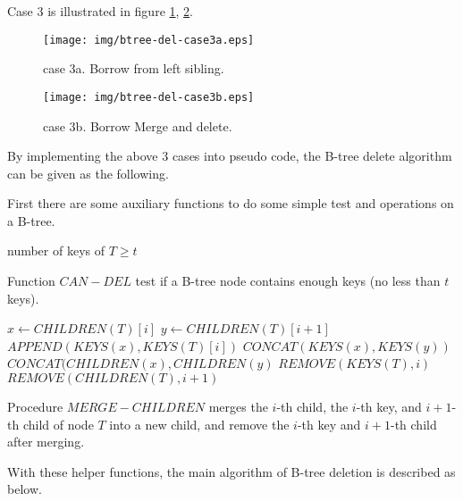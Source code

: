 \documentclass{article}
\begin{document}
Case 3 is illustrated in figure \ref{fig:btree-del-case3a}, \ref{fig:btree-del-case3b}.

\begin{figure}[htbp]
  \begin{center}
    \texttt{[image: img/btree-del-case3a.eps]}
    \caption{case 3a. Borrow from left sibling.} \label{fig:btree-del-case3a}
  \end{center}
\end{figure}

\begin{figure}[htbp]
  \begin{center}
    \texttt{[image: img/btree-del-case3b.eps]}
    \caption{case 3b. Borrow Merge and delete.} \label{fig:btree-del-case3b}
  \end{center}
\end{figure}

By implementing the above 3 cases into pseudo code, the B-tree delete algorithm
can be given as the following.

First there are some auxiliary functions to do some simple test and operations
on a B-tree.

\begin{algorithmic}[1]
  \State \Return number of keys of  $T \ge t$
\EndFunction
\end{algorithmic}

Function $CAN-DEL$ test if a B-tree node contains enough keys (no less than
$t$ keys).

\begin{algorithmic}[1]
 
  \State $x \leftarrow CHILDREN(T)[i]$
  \State $y \leftarrow CHILDREN(T)[i+1]$
  \State $APPEND(KEYS(x), KEYS(T)[i])$
  \State $CONCAT(KEYS(x), KEYS(y))$
  \State $CONCAT(CHILDREN(x), CHILDREN(y)$
  \State $REMOVE(KEYS(T), i)$
  \State $REMOVE(CHILDREN(T), i+1)$
\EndProcedure
\end{algorithmic}

Procedure $MERGE-CHILDREN$ merges the $i$-th child, the $i$-th key,
and $i+1$-th child of node $T$ into a new child, and remove the
$i$-th key and $i+1$-th child after merging.

With these helper functions, the main algorithm of B-tree deletion is described
as below.
\end{document}
